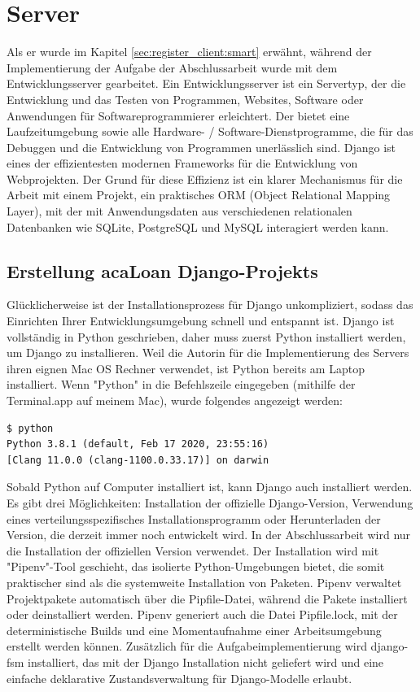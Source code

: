 \section{Server}
\label{sec:server}
Als er wurde im Kapitel \ref{sec:register_client:smart} erwähnt, während der Implementierung der Aufgabe der Abschlussarbeit wurde mit dem Entwicklungsserver gearbeitet. Ein Entwicklungsserver ist ein Servertyp, der die Entwicklung und das Testen von Programmen, Websites, Software oder Anwendungen für Softwareprogrammierer erleichtert. Der bietet eine Laufzeitumgebung sowie alle Hardware- / Software-Dienstprogramme, die für das Debuggen und die Entwicklung von Programmen unerlässlich sind. Django ist eines der effizientesten modernen Frameworks für die Entwicklung von Webprojekten. Der Grund für diese Effizienz ist ein klarer Mechanismus für die Arbeit mit einem Projekt, ein praktisches ORM (Object Relational Mapping Layer), mit der mit Anwendungsdaten aus verschiedenen relationalen Datenbanken wie SQLite, PostgreSQL und MySQL interagiert werden kann.

\subsection{Erstellung acaLoan Django-Projekts}
\label{sec:server:install}
Glücklicherweise ist der Installationsprozess für Django unkompliziert, sodass das Einrichten Ihrer Entwicklungsumgebung schnell und entspannt ist. Django ist vollständig in Python geschrieben, daher muss zuerst Python installiert werden, um Django zu installieren. Weil die Autorin für die Implementierung des Servers ihren eignen Mac OS Rechner verwendet, ist Python bereits am Laptop installiert. Wenn "Python" in die Befehlszeile eingegeben (mithilfe der Terminal.app auf meinem Mac), wurde folgendes angezeigt werden:
\begin{lstlisting}[caption={[Python Version überprüfen ] },captionpos=b]
$ python
Python 3.8.1 (default, Feb 17 2020, 23:55:16) 
[Clang 11.0.0 (clang-1100.0.33.17)] on darwin
\end{lstlisting}

Sobald Python auf Computer installiert ist, kann Django auch installiert werden. Es gibt drei Möglichkeiten: Installation der offizielle Django-Version, Verwendung eines verteilungsspezifisches Installationsprogramm oder Herunterladen der Version, die derzeit immer noch entwickelt wird. In der Abschlussarbeit wird nur die Installation der offiziellen Version verwendet. Der Installation wird mit "Pipenv"-Tool geschieht, das isolierte Python-Umgebungen bietet, die somit praktischer sind als die systemweite Installation von Paketen. Pipenv verwaltet Projektpakete automatisch über die Pipfile-Datei, während die Pakete installiert oder deinstalliert werden. Pipenv generiert auch die Datei Pipfile.lock, mit der deterministische Builds und eine Momentaufnahme einer Arbeitsumgebung erstellt werden können. Zusätzlich für die Aufgabeimplementierung wird django-fsm installiert, das mit der Django Installation nicht geliefert wird und eine einfache deklarative Zustandsverwaltung für Django-Modelle erlaubt. 


